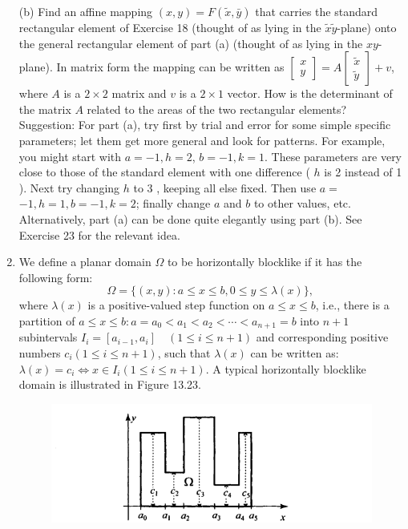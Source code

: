 \documentclass[../main.tex]{subfiles}
\begin{document}
\begin{enumerate}
(b) Find an affine mapping $(x, y)=F(\tilde{x}, \bar{y})$ that carries the standard rectangular element of Exercise 18 (thought of as lying in the $\tilde{x} \tilde{y}$-plane) onto the general rectangular element of part (a) (thought of as lying in the $x y$-plane). In matrix form the mapping can be written as $\left[\begin{array}{l}x \\ y\end{array}\right]=A\left[\begin{array}{l}\tilde{x} \\ \tilde{y}\end{array}\right]+v$, where $A$ is a $2 \times 2$ matrix and $v$ is a $2 \times 1$ vector. How is the determinant of the matrix $A$ related to the areas of the two rectangular elements?
Suggestion: For part (a), try first by trial and error for some simple specific parameters; let them get more general and look for patterns. For example, you might start with $a=-1, h=2$, $b=-1, k=1$. These parameters are very close to those of the standard element with one difference ( $h$ is 2 instead of 1 ). Next try changing $h$ to 3 , keeping all else fixed. Then use $a=$ $-1, h=1, b=-1, k=2$; finally change $a$ and $b$ to other values, etc. Alternatively, part (a) can be done quite elegantly using part (b). See Exercise 23 for the relevant idea.
	\item We define a planar domain $\Omega$ to be horizontally blocklike if it has the following form:
$$
\Omega=\{(x, y): a \leq x \leq b, 0 \leq y \leq \lambda(x)\} \text {, }
$$
where $\lambda(x)$ is a positive-valued step function on $a \leq x \leq b$, i.e., there is a partition of $a \leq x \leq b: a=a_{0}<a_{1}<a_{2}<\cdots<a_{n+1}=b$ into $n+1$ subintervals $I_{i}=\left[a_{i-1}, a_{i}\right] \quad(1 \leq i \leq n+1)$ and corresponding positive numbers $c_{i}(1 \leq i \leq n+1)$, such that $\lambda(x)$ can be written as: $\lambda(x)=c_{i} \Leftrightarrow x \in I_{i}(1 \leq i \leq n+1)$. A typical horizontally blocklike domain is illustrated in Figure 13.23.
\begin{figure}[H]
\includegraphics[width=0.9\linewidth]{8}

\end{figure}
\end{enumerate}
\end{document}
